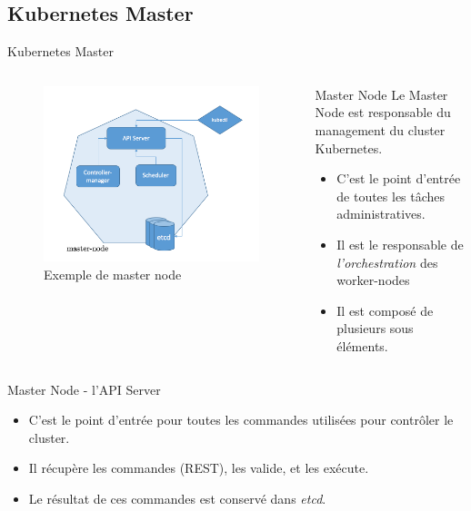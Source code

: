 \documentclass{bredelebeamer}
\begin{document}
\subsection{Kubernetes Master}
\begin{frame}{Kubernetes Master}
\begin{columns}
\begin{column}{0.4\textwidth}
\begin{figure}
\centering
\includegraphics[scale=0.25]{images/img25.png}
\caption{Exemple de master node}
\end{figure}
\end{column}
\begin{column}{0.6\textwidth}
\begin{block}{Master Node}
Le Master Node est responsable du management du cluster Kubernetes.
\begin{itemize}
\item C'est le point d'entrée de toutes les tâches administratives.
\item Il est le responsable de \textit{l'orchestration} des worker-nodes 
\item Il est composé de plusieurs sous éléments.
\end{itemize}
\end{block}
\end{column}
\end{columns}\pause
\begin{block}{Master Node - l'API Server}
\begin{itemize}
\item C'est le point d'entrée pour toutes les commandes utilisées pour contrôler le cluster.
\item Il récupère les commandes (REST), les valide, et les exécute.  
\item Le résultat de ces commandes est conservé dans \textit{etcd}.
\end{itemize}

\end{block}
\end{frame}
\end{document}
